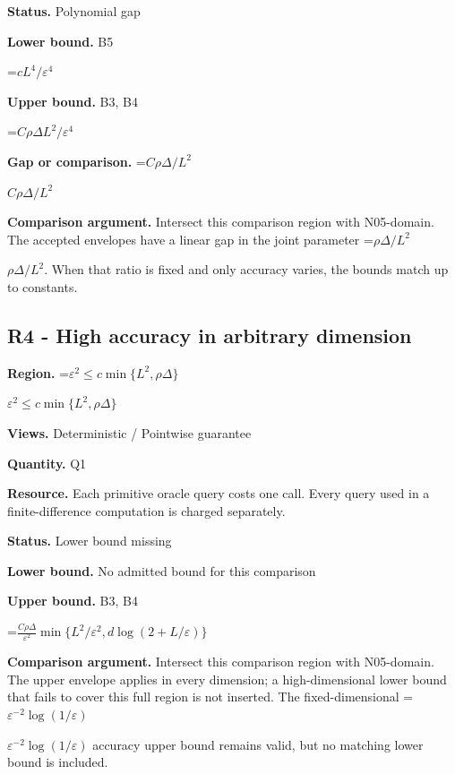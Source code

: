 \documentclass[10pt,a4paper]{article}
\newcommand{\AtlasMath}[1]{\par\begingroup\centering\setbox0=\hbox{$\displaystyle #1$}\ifdim\wd0>1.4\linewidth\typeout{ATLAS WIDE FORMULA: \the\wd0}\fi\ifdim\wd0>\linewidth\resizebox{\linewidth}{!}{\box0}\else\box0\fi\par\endgroup}
\newcommand{\AtlasInlineMath}[1]{\begingroup\setbox0=\hbox{$#1$}\ifdim\wd0>.4\linewidth\endgroup\AtlasMath{#1}\else\endgroup$#1$\fi}
\begin{document}
\textbf{Status.} Polynomial gap



\textbf{Lower bound.} B5



\AtlasMath{cL^4/\varepsilon^4}


\textbf{Upper bound.} B3, B4



\AtlasMath{C\rho\Delta L^2/\varepsilon^4}


\textbf{Gap or comparison.} \AtlasInlineMath{C\rho\Delta/L^2}



\textbf{Comparison argument.} Intersect this comparison region with N05-domain. The accepted envelopes have a linear gap in the joint parameter \AtlasInlineMath{\rho\Delta/L^2}. When that ratio is fixed and only accuracy varies, the bounds match up to constants.



\subsection{R4 - High accuracy in arbitrary dimension}


\textbf{Region.} \AtlasInlineMath{\varepsilon^2\le c\min\{L^2,\rho\Delta\}}



\textbf{Views.} Deterministic / Pointwise guarantee



\textbf{Quantity.} Q1



\textbf{Resource.} Each primitive oracle query costs one call. Every query used in a finite-difference computation is charged separately.



\textbf{Status.} Lower bound missing



\textbf{Lower bound.} No admitted bound for this comparison



\textbf{Upper bound.} B3, B4



\AtlasMath{\frac{C\rho\Delta}{\varepsilon^2}\min\{L^2/\varepsilon^2,d\log(2+L/\varepsilon)\}}


\textbf{Comparison argument.} Intersect this comparison region with N05-domain. The upper envelope applies in every dimension; a high-dimensional lower bound that fails to cover this full region is not inserted. The fixed-dimensional \AtlasInlineMath{\varepsilon^{-2}\log(1/\varepsilon)} accuracy upper bound remains valid, but no matching lower bound is included.
\end{document}

